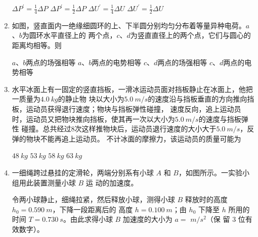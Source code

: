 \begin{enumerate}
\fourchoices
{$\Delta P^{\prime}=\frac{1}{4} \Delta P$}
{$\Delta P^{\prime}=\frac{1}{2} \Delta P$}
{$\Delta U^{\prime}=\frac{1}{4} \Delta U$}
{$\Delta U^{\prime}=\frac{1}{2} \Delta U$}



\item
如图，竖直面内一绝缘细圆环的上、下半圆分别均匀分布着等量异种电荷。$ a $、$ b $为圆环水平直径上的
两个点，$ c $、$ d $为竖直直径上的两个点，它们与圆心的距离均相等。则  
\begin{figure}[h!]
\centering

\end{figure}


\fourchoices
{$ a $、$ b $两点的场强相等}
{$ a $、$ b $两点的电势相等}
{$ c $、$ d $两点的场强相等}
{$ c $、$ d $两点的电势相等}


\item
水平冰面上有一固定的竖直挡板，一滑冰运动员面对挡板静止在冰面上，他把一质量为$ 4.0 \ kg $的静止物
块以大小为$ 5.0 \ m/s $的速度沿与挡板垂直的方向推向挡板，运动员获得退行速度；物块与挡板弹性碰撞，
速度反向，追上运动员时，运动员又把物块推向挡板，使其再一次以大小为$ 5.0 \ m/s $的速度与挡板弹性
碰撞。总共经过$ 8 $次这样推物块后，运动员退行速度的大小大于$ 5.0 \ m/s $，反弹的物块不能再追上运动员。
不计冰面的摩擦力，该运动员的质量可能为  

\fourchoices
{$ 48 \ kg $}
{$ 53 \ kg $}
{$ 58 \ kg $}
{$ 63 \ kg $}



\gaokaosy


\item 
一细绳跨过悬挂的定滑轮，两端分别系有小球 $ A $ 和 $ B $，如图所示。一实验小组用此装置测量小球 $ B $ 运
动的加速度。
\begin{figure}[h!]
\centering

\end{figure}

令两小球静止，细绳拉紧，然后释放小球，测得小球 $ B $ 释放时的高度 $ h_{0} =0.590 \ m $，下降一段距离后的
高度 $ h=0.100 \ m $；由 $ h_{0} $ 下降至 $ h $ 所用的时间 $ T=0.730 \ s $。由此求得小球 $ B $ 加速度的大小为 $ a=$ \underlinegap $m/s^{2} $（保
留 $ 3 $ 位有效数字）。


\end{enumerate}
